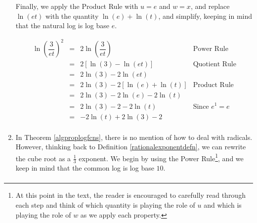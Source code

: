 \begin{ex}
\begin{enumerate}
Finally, we apply the Product Rule with $u=e$ and $w=x$, and replace $\ln(et)$ with the quantity $\ln(e) + \ln(t)$, and simplify, keeping in mind that the natural log is log base $e$.

\setlength{\extrarowheight}{6pt}
\[ \begin{array}{rclr}

\ln \left(\dfrac{3}{et}\right)^2 & = & 2 \ln \left(\dfrac{3}{et}\right) & \mbox{Power Rule} \\
                                 & = & 2 \left[ \ln(3) - \ln(et) \right] & \mbox{Quotient Rule} \\
                                 & = & 2 \ln(3) - 2\ln(et) & \\
                                 & = & 2 \ln(3) - 2\left[\ln(e) + \ln(t)\right] & \mbox{Product Rule} \\
                                 & = & 2 \ln(3) - 2\ln(e) - 2 \ln(t) & \\
                                 & = & 2\ln(3) - 2 - 2 \ln(t) & \mbox{Since $e^{1} = e$} \\
                                 & = & - 2 \ln(t) + 2\ln(3) - 2 & \\
\end{array}\]
\setlength{\extrarowheight}{2pt}
                        

\item In Theorem \ref{algproplogfcns}, there is no mention of how to deal with radicals.  However, thinking back to Definition \ref{rationalexponentdefn}, we can rewrite the cube root as a $\frac{1}{3}$ exponent.  We begin by using the Power Rule\footnote{At this point in the text, the reader is encouraged to carefully read through each step and think of which quantity is playing the role of $u$ and which is playing the role of $w$ as we apply each property.}, and we keep in mind that the common log is log base $10$. 
\setlength{\extrarowheight}{6pt}
\[ \begin{array}{rclr}


\end{array}\]
\end{enumerate}
\end{ex}
